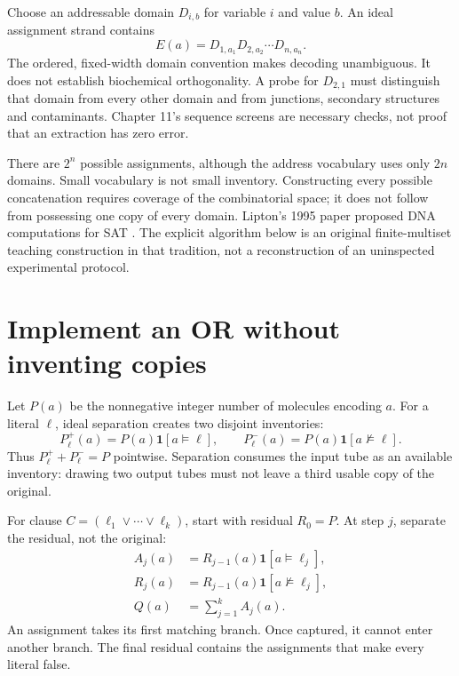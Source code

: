 Choose an addressable domain $D_{i,b}$ for variable $i$ and value $b$.
An ideal assignment strand contains
\begin{equation}
 E(a)=D_{1,a_1}D_{2,a_2}\cdots D_{n,a_n}.
\end{equation}
The ordered, fixed-width domain convention makes decoding unambiguous.
It does not establish biochemical orthogonality. A probe for $D_{2,1}$
must distinguish that domain from every other domain and from junctions,
secondary structures and contaminants. Chapter 11's sequence screens are
necessary checks, not proof that an extraction has zero error.


There are $2^n$ possible assignments, although the address vocabulary uses
only $2n$ domains. Small vocabulary is not small inventory. Constructing
every possible concatenation requires coverage of the combinatorial space;
it does not follow from possessing one copy of every domain.
Lipton's 1995 paper proposed DNA computations for SAT \cite{Lipton1995}.
The explicit algorithm below is an original finite-multiset teaching
construction in that tradition, not a reconstruction of an uninspected
experimental protocol.

\section{Implement an OR without inventing copies}
Let $P(a)$ be the nonnegative integer number of molecules encoding $a$.
For a literal $\ell$, ideal separation creates two disjoint inventories:
\begin{equation}
 P_\ell^+(a)=P(a)\mathbf1[a\models\ell],\qquad
 P_\ell^-(a)=P(a)\mathbf1[a\not\models\ell].
 \label{eq:split}
\end{equation}
Thus $P_\ell^++P_\ell^-=P$ pointwise. Separation consumes the input tube
as an available inventory: drawing two output tubes must not leave a
third usable copy of the original.

For clause $C=(\ell_1\lor\cdots\lor\ell_k)$, start with residual $R_0=P$.
At step $j$, separate the residual, not the original:
\begin{align}
 A_j(a)&=R_{j-1}(a)\mathbf1[a\models\ell_j],\\
 R_j(a)&=R_{j-1}(a)\mathbf1[a\not\models\ell_j],\\
 Q(a)&=\sum_{j=1}^{k} A_j(a).
 \label{eq:clause}
\end{align}
An assignment takes its first matching branch. Once captured, it cannot
enter another branch. The final residual contains the assignments that
make every literal false.


